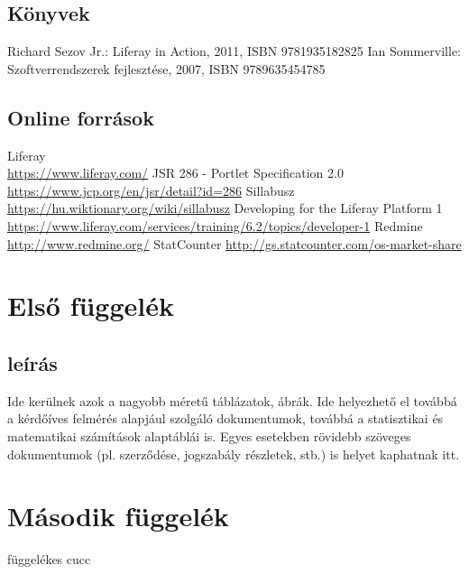\documentclass[hidelinks, 12pt, a4paper]{report}
\begin{document}
\clearpage
{}
\begin{thebibliography}{10}

\section*{Könyvek}

 Richard Sezov Jr.: Liferay in Action, 2011, ISBN 9781935182825
 Ian Sommerville: Szoftverrendszerek fejlesztése, 2007, ISBN 9789635454785

\section*{Online források}

 Liferay \\ \small\url{https://www.liferay.com/}
 JSR 286 - Portlet Specification 2.0 \\ \small\url{https://www.jcp.org/en/jsr/detail?id=286}
 Sillabusz \\ \small\url{https://hu.wiktionary.org/wiki/sillabusz}
 Developing for the Liferay Platform 1 \\ \small\url{https://www.liferay.com/services/training/6.2/topics/developer-1}
 Redmine \\ \small\url{http://www.redmine.org/}
 StatCounter \small\url{http://gs.statcounter.com/os-market-share}

\end{thebibliography}

\appendix
\chapter{Első függelék}

\section{leírás}

Ide kerülnek azok a nagyobb méretű táblázatok, ábrák.
Ide helyezhető el továbbá a kérdőíves felmérés alapjául szolgáló dokumentumok, továbbá a statisztikai és matematikai számítások alaptáblái is.
Egyes esetekben rövidebb szöveges dokumentumok (pl. szerződése, jogszabály részletek, stb.) is helyet kaphatnak itt.

\chapter{Második függelék}

függelékes cucc
\end{document}
